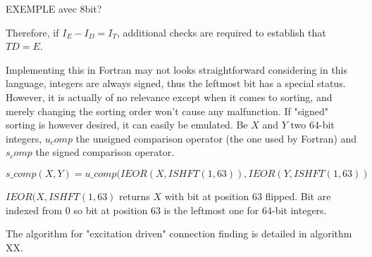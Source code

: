 EXEMPLE avec 8bit?

Therefore, if $I_E - I_D = I_T$, additional checks are required to establish that $TD = E$.


Implementing this in Fortran may not looks straightforward considering in this language, integers are always signed, thus the leftmost bit has a special status. However, it is actually of no relevance except when it comes to sorting, and merely changing the sorting order won't cause any malfunction.
If "signed" sorting is however desired, it can easily be emulated. Be $X$ and $Y$ two 64-bit integers, $u_comp$ the unsigned comparison operator (the one used by Fortran) and $s_comp$ the signed comparison operator.

\begin{equation}
s\_comp(X,Y) = u\_comp(IEOR(X,ISHFT(1,63)), IEOR(Y,ISHFT(1,63))
\end{equation}


$IEOR(X,ISHFT(1,63)$ returns $X$ with bit at position 63 flipped. Bit are indexed from 0 so bit at position 63 is the leftmost one for 64-bit integers.

The algorithm for "excitation driven" connection finding is detailed in algorithm XX.


